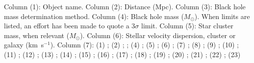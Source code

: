 \begin{table}
\begin{tabnote}
{Column (1): Object name. Column (2): Distance (Mpc). Column (3): Black hole mass determination method.
  Column (4): Black hole mass ($M_{\odot}$). When limits are listed,
  an effort has been made to quote a $3 \sigma$ limit. Column (5): Star cluster mass, when relevant ($M_{\odot}$).
  Column (6): Stellar velocity dispersion, cluster or galaxy (km~s$^{-1}$).
  Column (7): (1) \citet{kiziltanetal2017}; (2) \citet{mannetal2019}; \citet{tremouetal2018}; (4) \citet{noyolaetal2010}; (5) \citet{vandermarelanderson2010}; 
  (6) \citet{lutzgendorfetal2013}; (7) \citet{pereraetal2017}; (8) \citet{gielesetal2018}; (9) \citet{baumgardtetal2019};
  (10) \citet{gerssenetal2002}; (11) \citet{baumgardtetal2003}; (12) \citet{lutzgendorfetal2015}; (13) \citet{lanzonietal2013};
  (14) \citet{ibataetal2009}; (15) \citet{baumgardt2017}; (16) \citet{gebhardtetal2005}; (17) \citet{millerjonesetal2012}; (18) \citet{straubetal2014};
  (19) \citet{webbetal2012}; (20) \citet{csehetal2015}; (21) \citet{pashametal2014}; (22) \citet{brightmanetal2016}; (23) \citet{mezcuaetal20185252}  
}
\end{tabnote}
\end{table}
